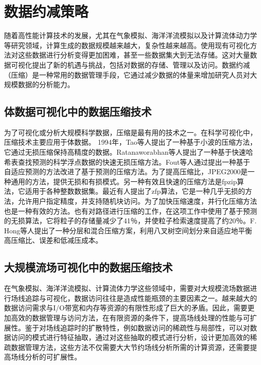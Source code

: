 \section{数据约减策略}
随着高性能计算技术的发展，尤其在气象模拟、海洋洋流模拟以及计算流体动力学等研究领域，计算生成的数据规模越来越大，复杂性越来越高。使用现有可视化方法对这些数据进行分析变得更加困难，甚至一些数据集大到无法存储。这对大量数据可视化提出了新的机遇与挑战，包括对数据的存储、管理以及访问。数据约减（压缩）是一种常用的数据管理手段，它通过减少数据的体量来增加研究人员对大规模数据的分析能力。
\subsection{体数据可视化中的数据压缩技术}
为了可视化或分析大规模科学数据，压缩是最有用的技术之一。在科学可视化中，压缩技术主要应用于体数据。 1994年，Tao等人提出了一种基于小波的压缩方法\cite{tao1994progressive}，它通过无损压缩保持高精度的数据。Ratanaworabhan等人提出了一种基于快速哈希表查找预测的科学浮点数据的快速无损压缩方法\cite{ratanaworabhan2006fast}。Fout等人通过提出一种基于自适应预测的方法\cite{fout2012adaptive}改进了基于预测的压缩方法。为了提高压缩比，JPEG2000\cite{usevitch2005jpeg2000}是一种通用的方法，提供无损和有损模式。另一种有效且快速的压缩方法是fpzip算法\cite{isenburg2005lossless}，它适用于各种整数数据集。最近有人提出了zfp算法\cite{lindstrom2014fixed}，它是一种几乎无损的方法，允许用户指定精度，并支持随机块访问。为了加快压缩速度，并行化压缩方法也是一种有效的方法\cite{bi20142}。也有对路径进行压缩的工作\cite{ellsworth2004interactive}，在这项工作中使用了基于预测的无损算法，它将粒子的存储量减少了41％，并使粒子检索速度提高了约20％。F. Hong等人提出了一种分层和混合压缩方案\cite{hong2017compression}，利用八叉树空间划分来自适应地平衡高压缩比、误差和低减压成本。

\subsection{大规模流场可视化中的数据压缩技术}
在气象模拟、海洋洋流模拟、计算流体力学这些领域中，需要对大规模流场数据进行场线追踪与可视化，数据访问往往是造成性能瓶颈的主要因素之一。越来越大的数据访问需求与I/O带宽和内存等资源的有限性形成了巨大的矛盾。因此，需要更加高效的数据管理与访问方法，在有限资源的条件下，提高场线处理的性能与可扩展性。鉴于对场线追踪时的扩散特性，例如数据访问的稀疏性与局部性，可以对数据访问的模式进行特征抽取，通过对这些抽取的模式进行分析，设计更加高效的稀疏数据管理方法，这些方法不仅需要大大节约场线分析所需的计算资源，还需要提高场线分析的可扩展性。

